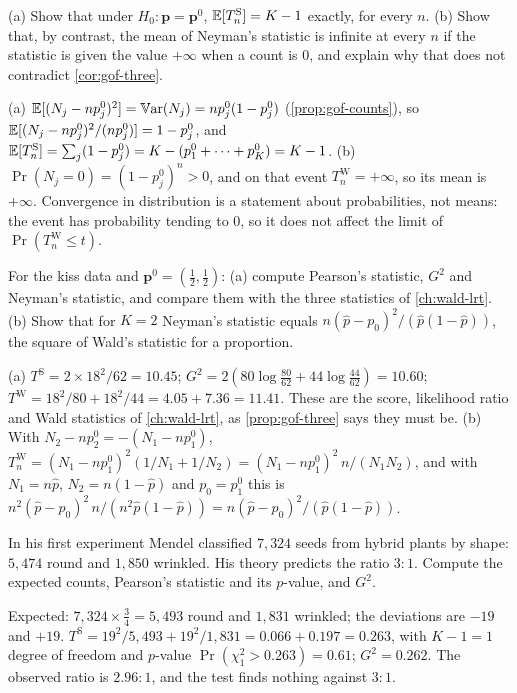 \begin{exercise}
\label{ex:gof-mean}
(a) Show that under $H_0: \mathbf{p} = \mathbf{p}^0$, $\operatorname*{\mathbb{E}}[T^{\mathrm{S}}_n] = K - 1$ exactly, for every $n$. (b) Show that, by contrast, the mean of Neyman's statistic is infinite at every $n$ if the statistic is given the value $+\infty$ when a count is $0$, and explain why that does not contradict \cref{cor:gof-three}.
\end{exercise}
\begin{solution}
(a) $\operatorname*{\mathbb{E}}[(N_j - np^0_j)^2] = \operatorname*{\mathbb{V}\text{ar}}(N_j) = np^0_j(1 - p^0_j)$ (\cref{prop:gof-counts}), so $\operatorname*{\mathbb{E}}[(N_j - np^0_j)^2/(np^0_j)] = 1 - p^0_j$, and $\operatorname*{\mathbb{E}}[T^{\mathrm{S}}_n] = \sum_j(1 - p^0_j) = K - (p^0_1 + \cdots + p^0_K) = K - 1$. (b) $\Pr(N_j = 0) = (1 - p^0_j)^n > 0$, and on that event $T^{\mathrm{W}}_n = +\infty$, so its mean is $+\infty$. Convergence in distribution is a statement about probabilities, not means: the event has probability tending to $0$, so it does not affect the limit of $\Pr(T^{\mathrm{W}}_n \leq t)$.
\end{solution}

\begin{exercise}
\label{ex:gof-kiss}
For the kiss data and $\mathbf{p}^0 = (\frac12, \frac12)$: (a) compute Pearson's statistic, $G^2$ and Neyman's statistic, and compare them with the three statistics of \cref{ch:wald-lrt}. (b) Show that for $K = 2$ Neyman's statistic equals $n(\hat{p} - p_0)^2/(\hat{p}(1 - \hat{p}))$, the square of Wald's statistic for a proportion.
\end{exercise}
\begin{solution}
(a) $T^{\mathrm{S}} = 2 \times 18^2/62 = 10.45$; $G^2 = 2(80\log\frac{80}{62} + 44\log\frac{44}{62}) = 10.60$; $T^{\mathrm{W}} = 18^2/80 + 18^2/44 = 4.05 + 7.36 = 11.41$. These are the score, likelihood ratio and Wald statistics of \cref{ch:wald-lrt}, as \cref{prop:gof-three} says they must be. (b) With $N_2 - np^0_2 = -(N_1 - np^0_1)$, $T^{\mathrm{W}}_n = (N_1 - np^0_1)^2(1/N_1 + 1/N_2) = (N_1 - np^0_1)^2\,n/(N_1N_2)$, and with $N_1 = n\hat{p}$, $N_2 = n(1 - \hat{p})$ and $p_0 = p^0_1$ this is $n^2(\hat{p} - p_0)^2\,n/(n^2\hat{p}(1 - \hat{p})) = n(\hat{p} - p_0)^2/(\hat{p}(1 - \hat{p}))$.
\end{solution}

\begin{exercise}
\label{ex:gof-seed}
In his first experiment Mendel classified $7{,}324$ seeds from hybrid plants by shape: $5{,}474$ round and $1{,}850$ wrinkled. His theory predicts the ratio $3:1$. Compute the expected counts, Pearson's statistic and its $p$-value, and $G^2$.
\end{exercise}
\begin{solution}
Expected: $7{,}324 \times \frac34 = 5{,}493$ round and $1{,}831$ wrinkled; the deviations are $-19$ and $+19$. $T^{\mathrm{S}} = 19^2/5{,}493 + 19^2/1{,}831 = 0.066 + 0.197 = 0.263$, with $K - 1 = 1$ degree of freedom and $p$-value $\Pr(\chi^2_1 > 0.263) = 0.61$; $G^2 = 0.262$. The observed ratio is $2.96:1$, and the test finds nothing against $3:1$.
\end{solution}

